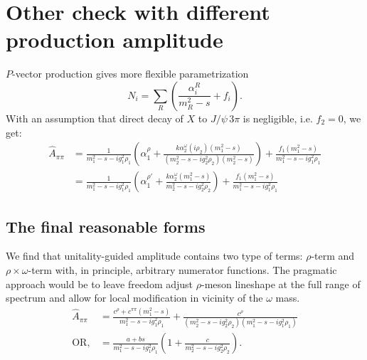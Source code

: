 \documentclass[aps,prd,superscriptaddress,onecolumn,nofootinbib,preprintnumbers,notitlepage]{revtex4-1}
\begin{document}
\section{Other check with different production amplitude}
$P$-vector production gives more flexible parametrization
\begin{equation}
  N_i = \sum_R \left( \frac{\alpha_i^R}{m_R^2-s} + f_i \right).
\end{equation}
With an assumption that direct decay of $X$ to $J/\psi\,3\pi$ is negligible, i.e. $f_2 = 0$, we get:
\begin{align}
  \hat{A}_{\pi\pi} &=
    \frac{1}{m_1^2-s-ig_1^2\rho_1} \left(
    \alpha_1^{\rho} + \frac{k \alpha_2^\omega (i\rho_2) (m_1^2-s)}{(m_2^2-s-ig_2^2\rho_2)(m_2^2-s)}
  \right)  + \frac{f_1(m_1^2-s)}{m_1^2-s-ig_1^2\rho_1}\\\nonumber
  &=
    \frac{1}{m_1^2-s-ig_1^2\rho_1} \left(
    \alpha_1^{\rho\prime} + \frac{k \alpha_2^\omega (m_1^2-s)}{m_2^2-s-ig_2^2\rho_2}
  \right)  + \frac{f_1(m_1^2-s)}{m_1^2-s-ig_1^2\rho_1}
\end{align}

\subsection{The final reasonable forms}
We find that unitality-guided amplitude contains two type of terms:
$\rho$-term and $\rho\times\omega$-term with, in principle, arbitrary numerator functions.
The pragmatic approach would be to leave freedom adjust $\rho$-meson lineshape
at the full range of spectrum and allow for local modification in vicinity of the $\omega$ mass.
\begin{align}
  \hat{A}_{\pi\pi}
  & = \frac{c^{\rho} + c^{\pi\pi}(m_1^2-s)}{m_1^2-s-ig_1^2\rho_1}
   + \frac{c^{\rho}}{(m_2^2-s-ig_2^2\rho_2)(m_1^2-s-ig_1^2\rho_1)}\\
  \mathrm{OR,} & =
  \frac{a + bs}{m_1^2-s-ig_1^2\rho_1}\left(
    1+ \frac{c}{m_2^2-s-ig_2^2\rho_2}
  \right).
\end{align}




\end{document}
